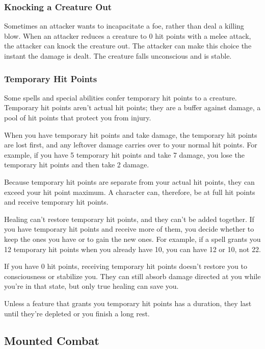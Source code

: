 \documentclass[
]{article}
\begin{document}
\hypertarget{knocking-a-creature-out}{%
\subsubsection{Knocking a Creature Out}\label{knocking-a-creature-out}}

Sometimes an attacker wants to incapacitate a foe, rather than deal a
killing blow. When an attacker reduces a creature to 0 hit points with a
melee attack, the attacker can knock the creature out. The attacker can
make this choice the instant the damage is dealt. The creature falls
unconscious and is stable.

\hypertarget{temporary-hit-points}{%
\subsubsection{Temporary Hit Points}\label{temporary-hit-points}}

Some spells and special abilities confer temporary hit points to a
creature. Temporary hit points aren't actual hit points; they are a
buffer against damage, a pool of hit points that protect you from
injury.

When you have temporary hit points and take damage, the temporary hit
points are lost first, and any leftover damage carries over to your
normal hit points. For example, if you have 5 temporary hit points and
take 7 damage, you lose the temporary hit points and then take 2 damage.

Because temporary hit points are separate from your actual hit points,
they can exceed your hit point maximum. A character can, therefore, be
at full hit points and receive temporary hit points.

Healing can't restore temporary hit points, and they can't be added
together. If you have temporary hit points and receive more of them, you
decide whether to keep the ones you have or to gain the new ones. For
example, if a spell grants you 12 temporary hit points when you already
have 10, you can have 12 or 10, not 22.

If you have 0 hit points, receiving temporary hit points doesn't restore
you to consciousness or stabilize you. They can still absorb damage
directed at you while you're in that state, but only true healing can
save you.

Unless a feature that grants you temporary hit points has a duration,
they last until they're depleted or you finish a long rest.

\hypertarget{mounted-combat}{%
\subsection{Mounted Combat}\label{mounted-combat}}
\end{document}

